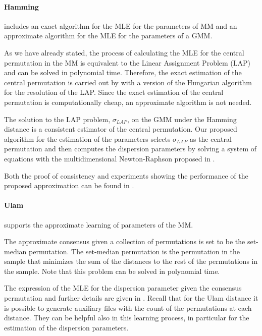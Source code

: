 \documentclass[article,nojss]{jss}
\begin{document}
\paragraph{Hamming}
 includes an exact algorithm for the MLE for the parameters of MM and an approximate algorithm for the MLE for the parameters of a GMM. 

As we have already stated, the process of calculating the MLE for the central permutation in the MM is equivalent to the Linear Assignment Problem (LAP) and can be solved in polynomial time. Therefore, the exact estimation of the central permutation is carried out by  with a version of the Hungarian algorithm for the resolution of the LAP. Since the exact estimation of the central permutation is computationally cheap, an approximate algorithm is not needed. 

The solution to the LAP problem, $\sigma_{LAP}$, on the GMM under the Hamming distance is a consistent estimator of the central permutation. Our proposed algorithm for the estimation of the parameters selects $\sigma_{LAP}$ as the central permutation and then computes the dispersion parameters by solving a system of equations with the multidimensional Newton-Raphson proposed in \cite{numerical_recipes_c}.

Both the proof of consistency and experiments showing the performance of the proposed approximation can be found in \cite{Irurozki2014a}.

\paragraph{Ulam}
 supports the approximate learning of parameters of the MM. 

The approximate consensus given a collection of permutations is set to be the set-median permutation. The set-median permutation is the permutation in the sample that minimizes the sum of the distances to the rest of the permutations in the sample. Note that this problem can be solved in polynomial time. 

The expression of the MLE for the dispersion parameter given the consensus permutation and further details are given in  \cite{Irurozki2014}.
Recall that for the Ulam distance it is possible to generate auxiliary files with the count of the permutations at each distance. They can be helpful also in this learning process, in particular for the estimation of the dispersion parameters.
\end{document}
